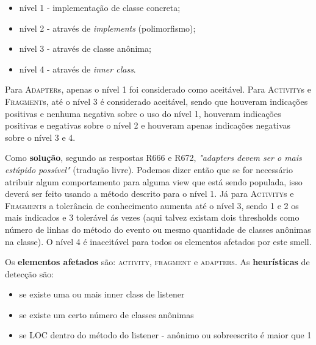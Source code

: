 \begin{itemize} 
	\item[$\circ$] n\'ivel 1 - implementa\c{c}\~ao de classe concreta;
	\item[$\circ$] n\'ivel 2 - atrav\'es de \textit{implements} (polimorfismo);
	\item[$\circ$] n\'ivel 3 - atrav\'es de classe an\^onima;
	\item[$\circ$] n\'ivel 4 - atrav\'es de \textit{inner class}.
\end{itemize}

Para \textsc{Adapter}s, apenas o n\'ivel 1 foi considerado como aceit\'avel. Para \textsc{Activity}s e \textsc{Fragment}s, at\'e o n\'ivel 3 \'e considerado aceit\'avel, sendo que houveram indica\c{c}\~oes positivas e nenhuma negativa sobre o uso do n\'ivel 1, houveram indica\c{c}\~oes positivas e negativas sobre o n\'ivel 2 e houveram apenas indica\c{c}\~oes negativas sobre o n\'ivel 3 e 4. 

Como \textbf{solu\c{c}\~ao}, segundo as respostas R666 e R672, \textit{"adapters devem ser o mais est\'upido poss\'ivel"} (tradu\c{c}\~ao livre). Podemos dizer ent\~ao que se for necess\'ario atribuir algum comportamento para alguma view que est\'a sendo populada, isso dever\'a ser feito usando a m\'etodo descrito para o n\'ivel 1. J\'a para \textsc{Activity}s e \textsc{Fragment}s a toler\^ancia de conhecimento aumenta at\'e o n\'ivel 3, sendo 1 e 2 os mais indicados e 3 toler\'avel \'as vezes (aqui talvez existam dois thresholds como n\'umero de linhas do m\'etodo do evento ou mesmo quantidade de classes an\^onimas na classe). O n\'ivel 4 \'e inaceit\'avel para todos os elementos afetados por este smell.

Os \textbf{elementos afetados} s\~ao: \textsc{activity}, \textsc{fragment} e \textsc{adapters}. As \textbf{heur\'isticas} de detec\c{c}\~ao s\~ao:

\begin{itemize} 
	\item[$\circ$] [n\'ivel 4] se existe uma ou mais inner class de listener
	\item[$\circ$] [n\'ivel 3] se existe um certo n\'umero de classes an\^onimas
	\item[$\circ$] [n\'ivel 2 e 3] se LOC dentro do m\'etodo do listener - an\^onimo ou sobreescrito \'e maior que 1
\end{itemize}





